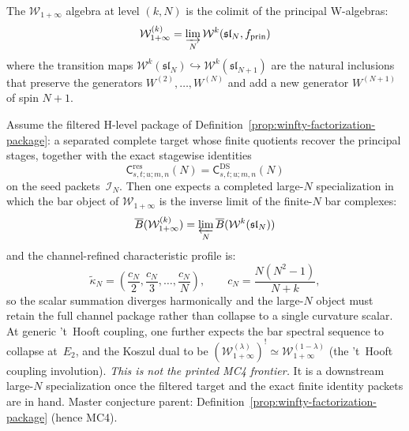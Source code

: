 \begin{definition}
\label{def:w-infty}
The $\mathcal{W}_{1+\infty}$ algebra at level $(k, N)$ is the
colimit of the principal W-algebras:
\[
\mathcal{W}_{1+\infty}^{(k)}
= \varinjlim_{N} \mathcal{W}^k(\mathfrak{sl}_N, f_{\mathrm{prin}})
\]
where the transition maps
$\mathcal{W}^k(\mathfrak{sl}_N) \hookrightarrow
\mathcal{W}^k(\mathfrak{sl}_{N+1})$ are the natural inclusions
that preserve the generators $W^{(2)}, \ldots, W^{(N)}$ and add a
new generator $W^{(N+1)}$ of spin $N+1$.
\end{definition}

\begin{conjecture}
\label{conj:w-infty-bar}
Assume the filtered H-level package of
Definition~\ref{prop:winfty-factorization-package}: a separated
complete target whose finite quotients recover the principal stages,
together with the exact stagewise identities
\[
\mathsf{C}^{\mathrm{res}}_{s,t;u;m,n}(N)
=
\mathsf{C}^{\mathrm{DS}}_{s,t;u;m,n}(N)
\]
on the seed packets~$\mathcal{I}_N$.  Then one expects a completed
large-$N$ specialization in which the bar object of
$\mathcal{W}_{1+\infty}$ is the inverse limit of the finite-$N$ bar
complexes:
\begin{equation}\label{eq:w-infty-bar}
\overline{B}(\mathcal{W}_{1+\infty}^{(k)})
= \varprojlim_{N} \overline{B}(\mathcal{W}^k(\mathfrak{sl}_N))
\end{equation}
and the channel-refined characteristic profile is:
\begin{equation}\label{eq:w-infty-curvature}
\widetilde{\kappa}_N
=
\left(\frac{c_N}{2},\frac{c_N}{3},\ldots,\frac{c_N}{N}\right),
\qquad c_N = \frac{N(N^2-1)}{N+k},
\end{equation}
so the scalar summation diverges harmonically and the large-$N$ object
must retain the full channel package rather than collapse to a single
curvature scalar.  At generic 't~Hooft coupling, one further expects
the bar spectral sequence to collapse at~$E_2$, and the Koszul dual to
be
$(\mathcal{W}_{1+\infty}^{(\lambda)})^!
\simeq \mathcal{W}_{1+\infty}^{(1-\lambda)}$
\textup{(}the 't~Hooft coupling involution\textup{)}.
\emph{This is not the printed MC4 frontier.}  It is a downstream
large-$N$ specialization once the filtered target and the exact finite
identity packets are in hand.
\textup{Master conjecture parent:}
Definition~\textup{\ref{prop:winfty-factorization-package}}
\textup{(}hence MC4\textup{)}.
\end{conjecture}

